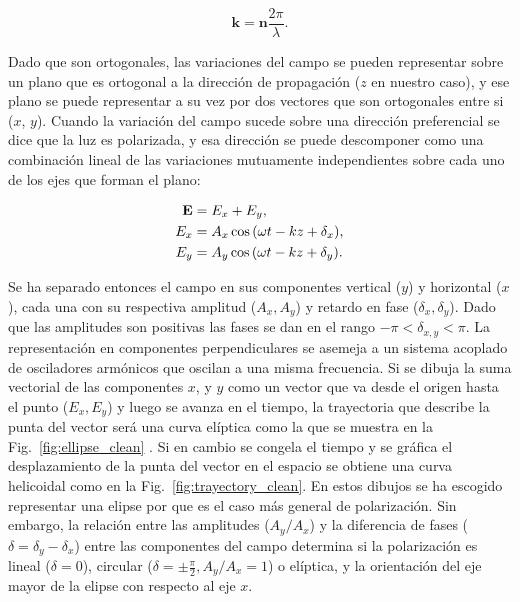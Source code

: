 $$\mathbf{k} = \mathbf{n} \frac{2\pi}{\lambda}.$$

Dado que son ortogonales, las variaciones del campo se pueden
representar sobre un plano que es 
ortogonal a la dirección de propagación ($z$ en nuestro caso), y ese plano se puede
representar a su vez por dos vectores que son ortogonales entre si
($x$, $y$).
Cuando la variación del campo sucede sobre una dirección preferencial
se dice que la luz es polarizada, y esa dirección se puede descomponer
como una combinación lineal de las variaciones mutuamente independientes
sobre cada uno de los ejes que forman el plano:

\begin{align}
\mathbf{E} &= E_x +E_y, \notag\\
E_x &= A_x\cos{ \left(\omega t -kz+\delta_x\right)} \label{eq:xcomp},\\
E_y &= A_y\cos{ \left(\omega t -kz+\delta_y\right)}\label{eq:ycomp}.
\end{align}

Se ha separado entonces el campo en sus componentes vertical ($y$) y
horizontal ($x$), cada una con su respectiva amplitud ($A_x,A_y$) y
retardo en fase ($\delta_x,\delta_y$). Dado que las amplitudes son
positivas las fases se dan en el rango $-\pi<\delta_{x,y}<\pi$.
La representación en componentes perpendiculares se asemeja a un
sistema acoplado de osciladores armónicos que oscilan a una misma
frecuencia. Si se dibuja la suma vectorial de las componentes $x$, y $y$ como
un vector que va desde el origen hasta el punto ($E_x,E_y$) y luego se
avanza en el tiempo, la trayectoria que describe la punta del vector
será una curva elíptica como la que 
se muestra en la Fig.~\ref{fig:ellipse_clean} . Si en cambio se congela el tiempo y se gráfica
el desplazamiento de la punta del vector en el espacio se obtiene una curva
helicoidal como en la Fig.~\ref{fig:trayectory_clean}. En estos dibujos se ha
escogido representar una elipse por que es el caso más general de polarización. Sin
embargo, la relación entre las amplitudes ($A_y/A_x$) y la
diferencia de fases ($\delta = \delta_y-\delta_x$) entre las componentes del
campo determina si la polarización es lineal ($\delta = 0$), circular
($\delta =\pm \frac{\pi}{2}, A_y/A_x=1$) o elíptica, y la orientación del eje
mayor de la elipse con respecto al eje $x$.

